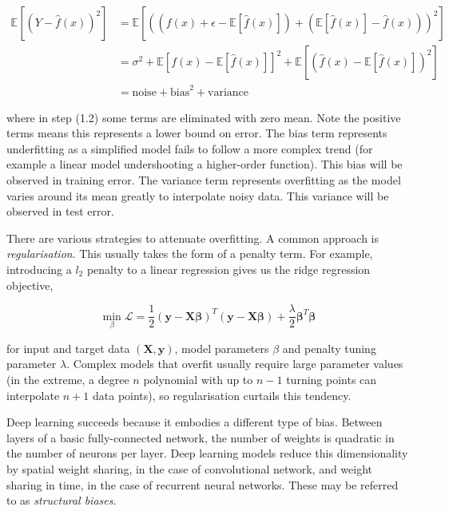 \begin{align}
\mathbb{E}[(Y - \hat{f}(x))^2] &= \mathbb{E}[((f(x) + \epsilon - \mathbb{E}[\hat{f}(x)]) + (\mathbb{E}[\hat{f}(x)] - \hat{f}(x)))^2] \\
&= \sigma^2 + \mathbb{E}[f(x) - \mathbb{E}[\hat{f}(x)]]^2 + \mathbb{E}[(\hat{f}(x) - \mathbb{E}[\hat{f}(x)])^2] \\
&= \text{noise} + \text{bias}^2 + \text{variance}
\end{align}

where in step (1.2) some terms are eliminated with zero mean. Note the positive terms means this represents a lower bound on error. The bias term represents underfitting as a simplified model fails to follow a more complex trend (for example a linear model undershooting a higher-order function). This bias will be observed in training error. The variance term represents overfitting as the model varies around its mean greatly to interpolate noisy data. This variance will be observed in test error.

There are various strategies to attenuate overfitting. A common approach is \emph{regularisation}. This usually takes the form of a penalty term. For example, introducing a $l_2$ penalty to a linear regression gives us the ridge regression objective,

\begin{equation}
\min_\beta\mathcal{L} = \frac{1}{2}(\mathbf{y} - \mathbf{X}\boldsymbol\beta)^T(\mathbf{y} - \mathbf{X}\boldsymbol\beta) + \frac{\lambda}{2}\boldsymbol\beta^T\boldsymbol\beta
\end{equation}

for input and target data $(\mathbf{X}, \mathbf{y})$, model parameters $\beta$ and penalty tuning parameter $\lambda$. Complex models that overfit usually require large parameter values (in the extreme, a degree $n$ polynomial with up to $n-1$ turning points can interpolate $n+1$ data points), so regularisation curtails this tendency. 

Deep learning succeeds because it embodies a different type of bias. Between layers of a basic fully-connected network, the number of weights is quadratic in the number of neurons per layer. Deep learning models reduce this dimensionality by spatial weight sharing, in the case of convolutional network, and weight sharing in time, in the case of recurrent neural networks. These may be referred to as \emph{structural biases}.

